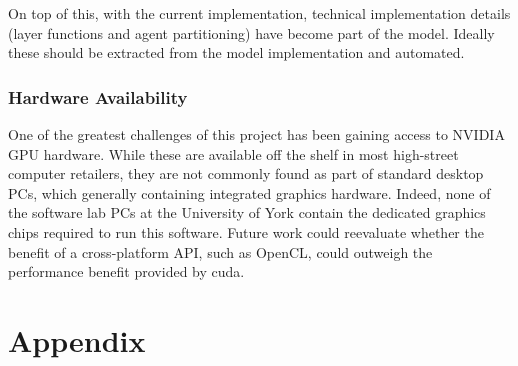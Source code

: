 \documentclass{UoYCSproject}
\begin{document}
On top of this, with the current implementation, technical implementation details (layer functions and agent partitioning) have become part of the model.
Ideally these should be extracted from the model implementation and automated.

\subsection{Hardware Availability}
One of the greatest challenges of this project has been gaining access to NVIDIA GPU hardware.
While these are available off the shelf in most high-street computer retailers, they are not commonly found as part of standard desktop PCs, which generally containing integrated graphics hardware.
Indeed, none of the software lab PCs at the University of York contain the dedicated graphics chips required to run this software.
Future work could reevaluate whether the benefit of a cross-platform API, such as OpenCL, could outweigh the performance benefit provided by \acrshort{cuda}.

\printbibliography
\chapter{Appendix}
\end{document}
